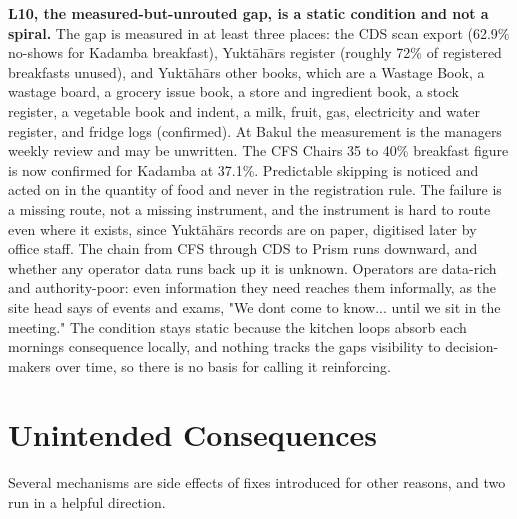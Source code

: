 \documentclass[
  10pt,
  table]{article}
\begin{document}
\textbf{L10, the measured-but-unrouted gap, is a static condition and not a spiral.} The gap is measured in at least three places: the CDS scan export (62.9\% no-shows for Kadamba breakfast), Yuktāhār\textquotesingle s register (roughly 72\% of registered breakfasts unused), and Yuktāhār\textquotesingle s other books, which are a Wastage Book, a wastage board, a grocery issue book, a store and ingredient book, a stock register, a vegetable book and indent, a milk, fruit, gas, electricity and water register, and fridge logs (confirmed). At Bakul the measurement is the manager\textquotesingle s weekly review and may be unwritten. The CFS Chair\textquotesingle s 35 to 40\% breakfast figure is now confirmed for Kadamba at 37.1\%. Predictable skipping is noticed and acted on in the quantity of food and never in the registration rule. The failure is a missing route, not a missing instrument, and the instrument is hard to route even where it exists, since Yuktāhār\textquotesingle s records are on paper, digitised later by office staff. The chain from CFS through CDS to Prism runs downward, and whether any operator data runs back up it is unknown. Operators are data-rich and authority-poor: even information they need reaches them informally, as the site head says of events and exams, "We don\textquotesingle t come to know... until we sit in the meeting." The condition stays static because the kitchen loops absorb each morning\textquotesingle s consequence locally, and nothing tracks the gap\textquotesingle s visibility to decision-makers over time, so there is no basis for calling it reinforcing.

\section{Unintended Consequences}\label{unintended-consequences}

Several mechanisms are side effects of fixes introduced for other reasons, and two run in a helpful direction.
\end{document}
